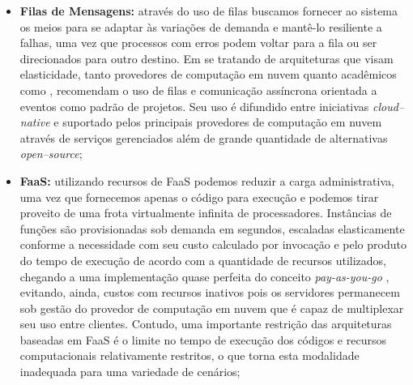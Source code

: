 \documentclass[english,brazilian]{UNISINOSmonografia} %
\begin{document}
\begin{itemize}
	\begin{itemize}
		
		\item \textbf{Filas de Mensagens:}
através do uso de filas buscamos fornecer ao sistema os meios para se adaptar às variações de demanda e mantê-lo resiliente a falhas, uma vez que processos com erros podem voltar para a fila ou ser direcionados para outro destino. Em se tratando de arquiteturas que visam elasticidade, tanto provedores de computação em nuvem quanto acadêmicos como , recomendam o uso de filas e comunicação assíncrona orientada a eventos como padrão de projetos.
Seu uso é difundido entre iniciativas \textit{cloud--native} e suportado pelos principais provedores de computação em nuvem através de serviços gerenciados além de grande quantidade de alternativas \textit{open--source};
		
		\item \textbf{FaaS:}
utilizando recursos de FaaS podemos reduzir a carga administrativa, uma vez que fornecemos apenas o código para execução e podemos tirar proveito de uma frota virtualmente infinita de processadores.
Instâncias de funções são provisionadas sob demanda em segundos, escaladas elasticamente conforme a necessidade com seu custo calculado por invocação e pelo produto do tempo de execução de acordo com a quantidade de recursos utilizados, chegando a uma implementação quase perfeita do conceito \textit{pay-as-you-go} \cite{Spillner}, evitando, ainda, custos com recursos inativos pois os servidores permanecem sob gestão do provedor de computação em nuvem que é capaz de multiplexar seu uso entre clientes. 
Contudo, uma importante restrição das arquiteturas baseadas em FaaS é o limite no tempo de execução dos códigos e recursos computacionais relativamente restritos, o que torna esta modalidade inadequada para uma variedade de cenários;


\end{itemize}
\end{itemize}
\end{document}
